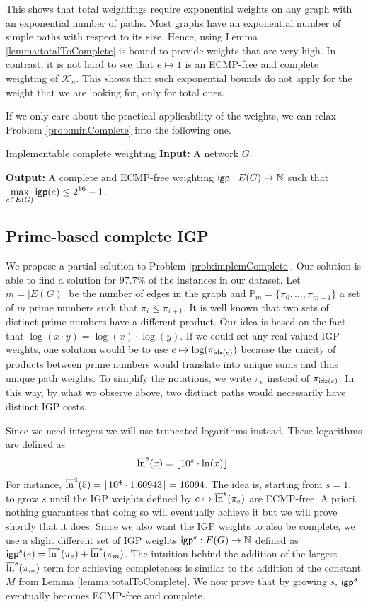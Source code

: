 This shows that total weightings require exponential weights on any graph with an exponential number of paths. Most graphs
have an exponential number of simple paths with respect to its size. Hence, using Lemma \ref{lemma:totalToComplete} is bound
to provide weights that are very high. In contrast, it is not hard to see that $e \mapsto 1$ is an ECMP-free and complete weighting of
$\mathcal{K}_n$. This shows that such exponential bounds do not apply for the weight that we are looking for, only for total ones.

If we only care about the practical applicability of the weights, we can relax Problem \ref{prob:minComplete} into the following one.

\begin{problem}{Implementable complete weighting}
\label{prob:implemComplete}
\textbf{Input:} A network $G$.

\textbf{Output:} A complete and ECMP-free weighting $\mathsf{igp} : E(G) \rightarrow \mathbb{N}$ such that
$\displaystyle \max_{e \in E(G)} \mathsf{igp}(e) \leq 2^{16} - 1$.
\end{problem}

\subsection{Prime-based complete IGP}

We propose a partial solution to Problem \ref{prob:implemComplete}. Our solution is able to find a solution for $97.7\%$ of the instances in our dataset.
Let $m = |E(G)|$ be the number of edges in the graph and $\mathbb{P}_m = \{ \pi_0, \ldots, \pi_{m - 1} \}$ a set of $m$ prime numbers such that
$\pi_i \leq \pi_{i + 1}$. It is well known that two sets of distinct prime numbers
have a different product. Our idea is based on the fact that $\log(x \cdot y) = \log(x) \cdot \log(y)$. If we could set any real valued IGP weights,
one solution would be to use $e \mapsto \log(\pi_{\mathsf{idx}(e)})$ because the unicity of products between prime numbers would translate into unique sums
and thus unique path weights. To simplify the notations, we write $\pi_e$ instead of $\pi_{\mathsf{idx}(e)}$.
In this way, by what we observe above, two distinct paths would necessarily have distinct IGP costs.

Since we need integers we will use truncated logarithms instead. These logarithms are defined as
$$
\overline{\ln}^{s}(x) = \lfloor 10^s \cdot \ln(x) \rfloor.
$$
For instance, $\overline{\ln}^{4}(5) = \lfloor 10^4 \cdot 1.60943 \rfloor = 16094$. The idea is, starting from $s = 1$, to grow $s$ 
until the IGP weights defined by $e \mapsto \overline{\ln}^{s}(\pi_e)$ are ECMP-free. A priori, nothing guarantees that doing so will 
eventually achieve it but we will prove shortly that it does. Since we also want the IGP weights to also be complete, we use
a slight different set of IGP weights $\mathsf{igp}^s : E(G) \rightarrow \mathbb{N}$ defined as $\mathsf{igp}^s(e) = \overline{\ln}^{s}(\pi_e) + \overline{\ln}^{s}(\pi_m)$.
The intuition behind the addition of the largest $\overline{\ln}^{s}(\pi_m)$ term for achieving completeness is similar to the addition of the constant $M$
from Lemma \ref{lemma:totalToComplete}. We now prove that by growing $s$, $\mathsf{igp}^s$ eventually becomes ECMP-free and complete.

